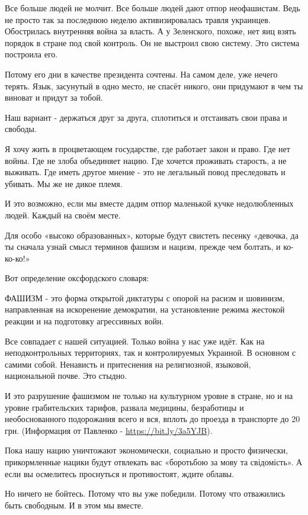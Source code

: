  Все больше людей не молчит. Все больше людей дают отпор неофашистам. Ведь не
 просто так за последнюю неделю активизировалась травля украинцев. Обострилась
 внутренняя война за власть. А у Зеленского, похоже, нет яиц взять порядок в
 стране под свой контроль. Он не выстроил свою систему. Это система построила
 его.

Потому его дни в качестве президента сочтены. На самом деле, уже нечего терять.
Язык, засунутый в одно место, не спасёт никого, они придумают в чем ты виноват
и придут за тобой. 

Наш вариант - держаться друг за друга, сплотиться и отстаивать свои права и
свободы.

 Я хочу жить в процветающем государстве, где работает закон и право. Где нет
 войны. Где не злоба объединяет нацию. Где хочется проживать старость, а не
 выживать. Где иметь другое мнение - это не легальный повод преследовать и
 убивать. Мы же не дикое племя. 

И это возможно, если мы вместе дадим отпор маленькой кучке недолюбленных людей.
Каждый на своём месте. 

Для особо «высоко образованных», которые будут свистеть песенку «девочка, да ты
сначала узнай смысл терминов фашизм и нацизм, прежде чем болтать, и ко-ко-ко!» 

Вот определение оксфордского словаря: 

ФАШИЗМ - это форма открытой диктатуры с опорой на расизм и шовинизм,
направленная на искоренение демократии, на установление режима жестокой реакции
и на подготовку агрессивных войн. 

Все совпадает с нашей ситуацией. Только война у нас уже идёт. Как на
неподконтрольных территориях, так и контролируемых Украиной. В основном с
самими собой. Ненависть и притеснения на религиозной, языковой, национальной
почве. Это стыдно.

И это разрушение фашизмом не только на культурном уровне в стране, но и на
уровне грабительских тарифов, развала медицины, безработицы и необоснованного
подорожания всего и вся, вплоть до проезда в транспорте до 20 грн. (Информация
от Павленко - \url{https://bit.ly/3a5YJB}).

Пока нашу нацию уничтожают экономически, социально и просто физически,
прикормленные нацики будут отвлекать вас «боротьбою за мову та свідомість». А
если вы осмелитесь проснуться и противостоят, ждите облавы.

Но ничего не бойтесь. Потому что вы уже победили. Потому что отважились быть
свободным. И в этом мы вместе.
